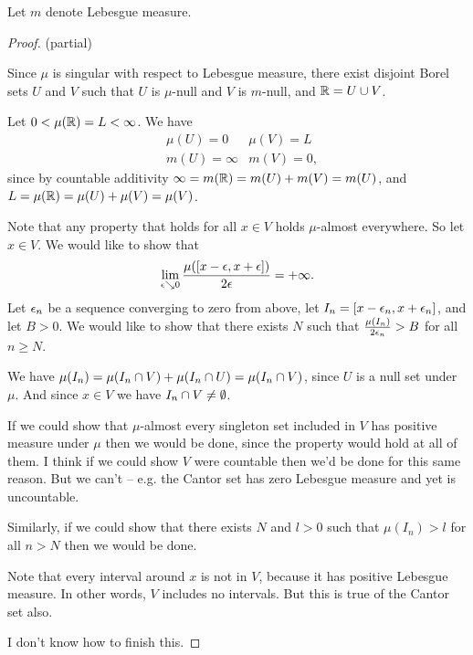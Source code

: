Let $m$ denote Lebesgue measure.

\begin{proof}
   (partial)

  Since $\mu$ is singular with respect to Lebesgue measure, there exist disjoint Borel sets $U$ and $V$ such
  that $U$ is $\mu$-null and $V$ is $m$-null, and $\mathbb{R} = U \cup V$.

  Let $0 < \mu(\mathbb{R}) = L < \infty$. We have
  \begin{align*}
    &\mu(U) = 0     & \mu(V) = L \\
    &m(U) = \infty & m(V) = 0,
  \end{align*}
  since by countable additivity $\infty = m(\mathbb{R}) = m(U) + m(V) = m(U)$,
  and $L = \mu(\mathbb{R}) = \mu(U) + \mu(V) = \mu(V)$.

  Note that any property that holds for all $x \in V$ holds $\mu$-almost everywhere. So let $x \in V$. We would
  like to show that
  \begin{align*}
    \lim_{\eps \searrow 0} \frac{\mu([x - \eps, x + \eps])}{2\eps} = +\infty.
  \end{align*}
  Let $\epsilon_n$ be a sequence converging to zero from above, let $I_n = [x - \epsilon_n, x + \epsilon_n]$, and
  let $B > 0$. We would like to show that there exists $N$ such that $\frac{\mu(I_n)}{2\epsilon_n} > B$ for
  all $n \geq N$.

  We have $\mu(I_n) = \mu(I_n \cap V) + \mu(I_n \cap U) = \mu(I_n \cap V)$, since $U$ is a null set
  under $\mu$. And since $x \in V$ we have $I_n \cap V \neq \emptyset$.

  If we could show that $\mu$-almost every singleton set included in $V$ has positive measure under $\mu$ then
  we would be done, since the property would hold at all of them. I think if we could show $V$ were countable
  then we'd be done for this same reason. But we can't -- e.g. the Cantor set has zero Lebesgue measure and yet
  is uncountable.

  Similarly, if we could show that there exists $N$ and $l > 0$ such that $\mu(I_n) > l$ for all $n > N$ then
  we would be done.

  Note that every interval around $x$ is not in $V$, because it has positive Lebesgue measure. In other
  words, $V$ includes no intervals. But this is true of the Cantor set also.

   I don't know how to finish this.
\end{proof}



